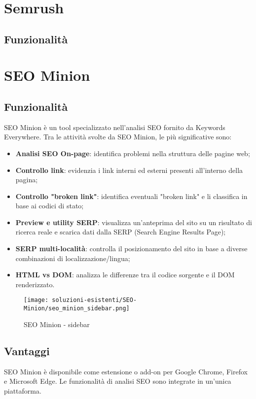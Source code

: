 \section{Semrush}

\subsection{Funzionalità}
\par 




\section{SEO Minion}

\subsection{Funzionalità}
\par SEO Minion è un tool specializzato nell’analisi SEO fornito da Keywords Everywhere. Tra le attività svolte da SEO Minion, le più significative sono:
\begin{itemize}
    \item \textbf{Analisi SEO On-page}: identifica problemi nella struttura delle pagine web;
    \item \textbf{Controllo link}: evidenzia i link interni ed esterni presenti all’interno della pagina;
    \item \textbf{Controllo "broken link"}: identifica eventuali "broken link" e li classifica in base ai codici di stato;
    \item \textbf{Preview e utility SERP}: visualizza un'anteprima del sito su un risultato di ricerca reale e scarica dati dalla SERP (Search Engine Results Page);
    \item \textbf{SERP multi-località}: controlla il posizionamento del sito in base a diverse combinazioni di localizzazione/lingua;
    \item \textbf{HTML vs DOM}: analizza le differenze tra il codice sorgente e il DOM renderizzato.
\end{itemize}

\begin{figure}[H] 
    \centering 
    \texttt{[image: soluzioni-esistenti/SEO-Minion/seo\_minion\_sidebar.png]} 
    \caption{SEO Minion - sidebar}
\end{figure}

\subsection{Vantaggi}
\par SEO Minion è disponibile come estensione o add-on per Google Chrome, Firefox e Microsoft Edge. Le funzionalità di analisi SEO sono integrate in un'unica piattaforma.


